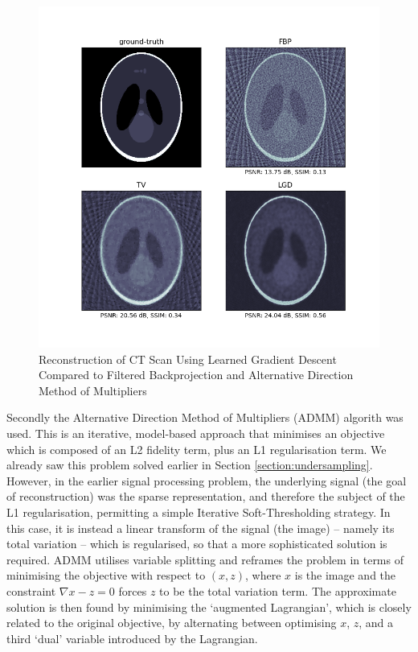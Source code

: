 \documentclass[12pt]{article}
\begin{document}
\begin{figure}[htp]
    \includegraphics[scale=0.65]{figures/lgd.png}
    \caption{Reconstruction of CT Scan Using Learned Gradient Descent Compared to Filtered Backprojection and Alternative Direction Method of Multipliers}
    \label{fig:lgd}
\end{figure}

Secondly the Alternative Direction Method of Multipliers (ADMM) algorith was used.
This is an iterative, model-based approach that minimises an objective which is composed of an L2 fidelity term, plus an L1 regularisation term.
We already saw this problem solved earlier in Section \ref{section:undersampling}.
However, in the earlier signal processing problem, the underlying signal (the goal of reconstruction) was the sparse representation,
and therefore the subject of the L1 regularisation, permitting a simple Iterative Soft-Thresholding strategy.
In this case, it is instead a linear transform of the signal (the image) -- namely its total variation -- which is regularised,
so that a more sophisticated solution is required.
ADMM utilises variable splitting and reframes the problem in terms of minimising the objective with respect to $(x, z)$,
where $x$ is the image and the constraint $\nabla x - z =0$ forces $z$ to be the total variation term.
The approximate solution is then found by minimising the `augmented Lagrangian', which is closely related to the original objective,
by alternating between optimising $x$, $z$, and a third `dual' variable introduced by the Lagrangian.
\end{document}
